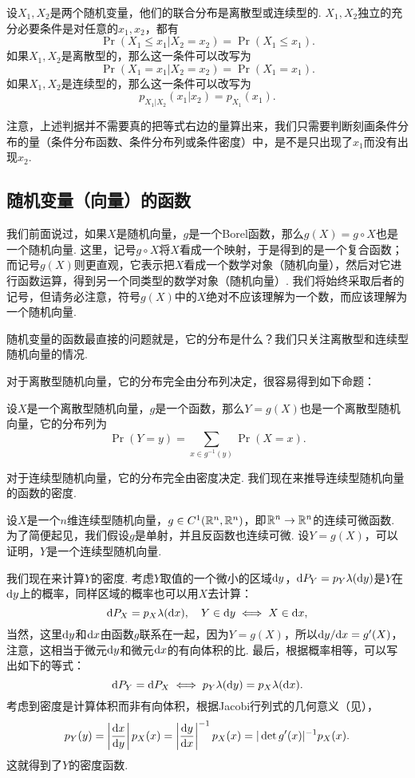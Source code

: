 \begin{proposition}\label{prop:independence-conditional}
设$X_1,X_2$是两个随机变量，他们的联合分布是离散型或连续型的. $X_1,X_2$独立的充分必要条件是对任意的$x_1,x_2$，都有
\[\Pr(X_1\leq x_1|X_2=x_2)=\Pr(X_1\leq x_1).\]
如果$X_1,X_2$是离散型的，那么这一条件可以改写为
\[\Pr(X_1=x_1|X_2=x_2)=\Pr(X_1=x_1).\]
如果$X_1,X_2$是连续型的，那么这一条件可以改写为
\[p_{X_1|X_2}(x_1|x_2)=p_{X_1}(x_1).\]
\end{proposition}

注意，上述判据并不需要真的把等式右边的量算出来，我们只需要判断刻画条件分布的量（条件分布函数、条件分布列或条件密度）中，是不是只出现了$x_1$而没有出现$x_2$. 

\subsection{随机变量（向量）的函数}\label{subsec:random-function}

我们前面说过，如果$X$是随机向量，$g$是一个Borel函数，那么$g(X)=g\circ X$也是一个随机向量. 这里，记号$g\circ X$将$X$看成一个映射，于是得到的是一个复合函数；而记号$g(X)$则更直观，它表示把$X$看成一个数学对象（随机向量），然后对它进行函数运算，得到另一个同类型的数学对象（随机向量）. 我们将始终采取后者的记号，但请务必注意，符号$g(X)$中的$X$绝对不应该理解为一个数，而应该理解为一个随机向量. 

随机变量的函数最直接的问题就是，它的分布是什么？我们只关注离散型和连续型随机向量的情况.

对于离散型随机向量，它的分布完全由分布列决定，很容易得到如下命题：

\begin{proposition}\label{prop:discrete-function}
设$X$是一个离散型随机向量，$g$是一个函数，那么$Y=g(X)$也是一个离散型随机向量，它的分布列为
\[\Pr(Y=y)=\sum_{x\in g^{-1}(y)}\Pr(X=x).\]
\end{proposition}

对于连续型随机向量，它的分布完全由密度决定. 我们现在来推导连续型随机向量的函数的密度. 

设$X$是一个$n$维连续型随机向量，$g\in C^1(\mathbb{R}^n,\mathbb{R}^n)$，即$\mathbb{R}^n\to\mathbb{R}^n$的连续可微函数. 为了简便起见，我们假设$g$是单射，并且反函数也连续可微. 设$Y=g(X)$，可以证明，$Y$是一个连续型随机向量. 

我们现在来计算$Y$的密度. 考虑$Y$取值的一个微小的区域$\mathrm{d} y$，$\mathrm{d} P_Y=p_Y\lambda(\mathrm{d} y)$是$Y$在$\mathrm{d} y$上的概率，同样区域的概率也可以用$X$去计算：
\[\mathrm{d} P_X=p_X\lambda(\mathrm{d} x),\quad Y\in\mathrm{d} y\iff X\in\mathrm{d} x,\]
当然，这里$\mathrm{d} y$和$\mathrm{d} x$由函数$g$联系在一起，因为$Y=g(X)$，所以$\mathrm{d} y/\mathrm{d} x=g'(X)$，注意，这相当于微元$\mathrm{d} y$和微元$\mathrm{d} x$的有向体积的比. 最后，根据概率相等，可以写出如下的等式：
\begin{equation}
    \mathrm{d} P_Y=\mathrm{d} P_X\iff p_Y\lambda(\mathrm{d} y)=p_X\lambda(\mathrm{d} x).\label{eq:eq-prob}
\end{equation}
考虑到密度是计算体积而非有向体积，根据Jacobi行列式的几何意义（见），
\[p_Y(y)=\left|\frac{\mathrm{d} x}{\mathrm{d} y}\right|p_X(x)=\left|\frac{\mathrm{d} y}{\mathrm{d} x}\right|^{-1}p_X(x)=|\det g'(x)|^{-1}p_X(x).\]
这就得到了$Y$的密度函数. 

